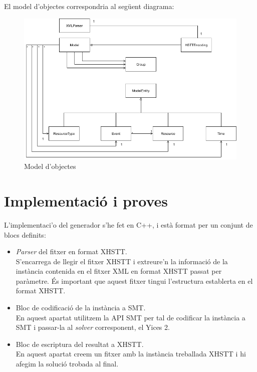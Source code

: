 \documentclass[11pt,a4paper,twoside]{report}
\begin{document}
  El model d'objectes correspondria al següent diagrama:
  \begin{figure}[ht!]
    \includegraphics[width=\textwidth]{Diagrames/UMLKai.png}
    \caption{Model d'objectes}
    \label{fig:ObjectModel}
  \end{figure}
  



  

  \chapter{Implementació i proves}

  L'implementaci'o del generador s'he fet en C++, i està format per un conjunt de blocs definits:\
  \begin{itemize}
    \item \textit{Parser }del fitxer en format XHSTT. \\ S'encarrega de llegir el fitxer XHSTT i extreure'n la informació de la instància contenida en el fitxer XML en format XHSTT passat per paràmetre. És important que aquest fitxer tingui l'estructura establerta en el format XHSTT.
    \item Bloc de codificació de la instància a SMT. \\ En aquest apartat utilitzem la API SMT per tal de codificar la instància a SMT i passar-la al \textit{solver} corresponent, el Yices 2.
    \item Bloc de escriptura del resultat a XHSTT. \\ En aquest apartat creem un fitxer amb la instància treballada XHSTT i hi afegim la solució trobada al final.
  \end{itemize}
\end{document}
